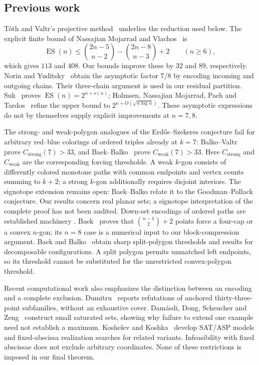 \documentclass[11pt]{amsart}
\numberwithin{equation}{section}
\theoremstyle{definition}
\theoremstyle{remark}
\DeclareMathOperator{\ES}{ES}
\begin{document}
\subsection{Previous work}
T\'oth and Valtr's projective method~\cite{TV98,TV05} underlies the
reduction used below. The explicit finite bound of Nassajian Mojarrad
and Vlachos~\cite[Theorem~1.1]{MV} is
\begin{equation}\label{eq:MV}
 \ES(n)\le\binom{2n-5}{n-2}-\binom{2n-8}{n-3}+2\qquad(n\ge6),
\end{equation}
which gives $113$ and $408$. Our bounds improve these by $32$ and $89$,
respectively. Norin and Yuditsky~\cite{NY} obtain the asymptotic factor
$7/8$ by encoding incoming and outgoing chains. Their three-chain
argument is used in our residual partition. Suk~\cite{Suk} proves
$\ES(n)=2^{n+o(n)}$; Holmsen, Nassajian Mojarrad, Pach and
Tardos~\cite{HMPT} refine the upper bound to
$2^{n+O(\sqrt{n\log n})}$. These asymptotic expressions do not by
themselves supply explicit improvements at $n=7,8$.

The strong- and weak-polygon analogues of the Erd\H{o}s--Szekeres
conjecture fail for arbitrary red--blue colorings of ordered triples
already at $k=7$: Balko--Valtr~\cite{BV} prove $C_{\mathrm{strong}}(7)>33$,
and Baek--Balko~\cite{BB} prove $C_{\mathrm{weak}}(7)>33$.
Here $C_{\mathrm{strong}}$ and $C_{\mathrm{weak}}$ are the corresponding
forcing thresholds. A weak $k$-gon consists of differently colored
monotone paths with common endpoints and vertex counts summing to
$k+2$; a strong $k$-gon additionally requires disjoint interiors.
The signotope extension remains open: Baek--Balko
\cite[Section~3]{BB} relate it to the Goodman--Pollack conjecture.
Our results concern real planar sets; a signotope interpretation of
the complete proof has not been audited.
Down-set encodings of ordered paths are established machinery
\cite{MS}. Baek~\cite{Baek} proves that
$\binom{n-1}{2}+2$ points force a four-cap or a convex $n$-gon;
its $n=8$ case is a numerical input to our block-compression argument.
Baek and Balko~\cite{BB} obtain sharp split-polygon thresholds and
results for decomposable configurations. A split polygon permits
unmatched left endpoints, so its threshold cannot be substituted for
the unrestricted convex-polygon threshold.

Recent computational work also emphasizes the distinction between an
encoding and a complete exclusion. Dumitru~\cite{Dumitru} reports
refutations of anchored thirty-three-point subfamilies, without an
exhaustive cover. Dam\'asdi, Dong, Scheucher and Zeng~\cite{DDSZ} construct
small saturated sets, showing why failure to extend one example need
not establish a maximum. Koshelev and Koshka~\cite{KK} develop SAT/ASP
models and fixed-abscissa realization searches for related variants.
Infeasibility with fixed abscissae does not exclude arbitrary coordinates.
None of these restrictions is imposed in our final theorem.
\end{document}
